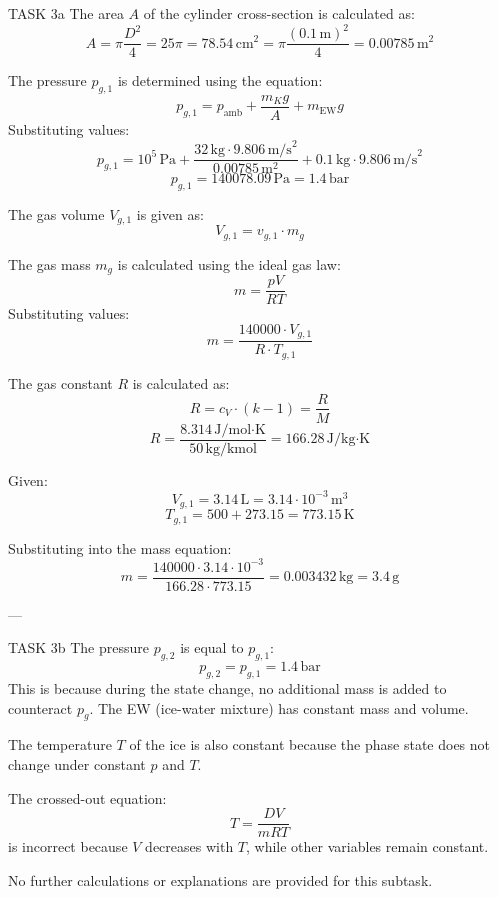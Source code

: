 TASK 3a  
The area \( A \) of the cylinder cross-section is calculated as:  
\[
A = \pi \frac{D^2}{4} = 25\pi = 78.54 \, \text{cm}^2 = \pi \frac{(0.1 \, \text{m})^2}{4} = 0.00785 \, \text{m}^2
\]  

The pressure \( p_{g,1} \) is determined using the equation:  
\[
p_{g,1} = p_{\text{amb}} + \frac{m_K g}{A} + m_{\text{EW}} g
\]  
Substituting values:  
\[
p_{g,1} = 10^5 \, \text{Pa} + \frac{32 \, \text{kg} \cdot 9.806 \, \text{m/s}^2}{0.00785 \, \text{m}^2} + 0.1 \, \text{kg} \cdot 9.806 \, \text{m/s}^2
\]  
\[
p_{g,1} = 140078.09 \, \text{Pa} = 1.4 \, \text{bar}
\]  

The gas volume \( V_{g,1} \) is given as:  
\[
V_{g,1} = v_{g,1} \cdot m_g
\]  

The gas mass \( m_g \) is calculated using the ideal gas law:  
\[
m = \frac{p V}{R T}
\]  
Substituting values:  
\[
m = \frac{140000 \cdot V_{g,1}}{R \cdot T_{g,1}}
\]  

The gas constant \( R \) is calculated as:  
\[
R = c_V \cdot (k - 1) = \frac{R}{M}
\]  
\[
R = \frac{8.314 \, \text{J/mol·K}}{50 \, \text{kg/kmol}} = 166.28 \, \text{J/kg·K}
\]  

Given:  
\[
V_{g,1} = 3.14 \, \text{L} = 3.14 \cdot 10^{-3} \, \text{m}^3
\]  
\[
T_{g,1} = 500 + 273.15 = 773.15 \, \text{K}
\]  

Substituting into the mass equation:  
\[
m = \frac{140000 \cdot 3.14 \cdot 10^{-3}}{166.28 \cdot 773.15} = 0.003432 \, \text{kg} = 3.4 \, \text{g}
\]  

---

TASK 3b  
The pressure \( p_{g,2} \) is equal to \( p_{g,1} \):  
\[
p_{g,2} = p_{g,1} = 1.4 \, \text{bar}
\]  
This is because during the state change, no additional mass is added to counteract \( p_{g} \). The EW (ice-water mixture) has constant mass and volume.  

The temperature \( T \) of the ice is also constant because the phase state does not change under constant \( p \) and \( T \).  

The crossed-out equation:  
\[
T = \frac{DV}{mRT}
\]  
is incorrect because \( V \) decreases with \( T \), while other variables remain constant.  

No further calculations or explanations are provided for this subtask.